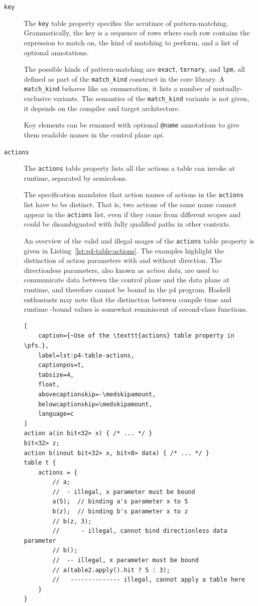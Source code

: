 \begin{description}

\item[\texttt{key}] The \texttt{key} table property specifies the scrutinee of
pattern-matching. Grammatically, the key is a sequence of rows where each row
contains the expression to match on, the kind of matching to perform, and a list
of optional annotations.

The possible kinds of pattern-matching are \texttt{exact}, \texttt{ternary}, and
\texttt{lpm}, all defined as part of the \texttt{match\_kind} construct in the
core library. A \texttt{match\_kind} behaves like an enumeration, it lists a
number of mutually-exclusive variants. The semantics of the \texttt{match\_kind}
variants is not given, it depends on the compiler and target architecture.

Key elements can be renamed with optional \texttt{@name} annotations to give
them readable names in the control plane \acrshort{api}.

\item[\texttt{actions}] The \texttt{actions} table property lists all the
actions a table can invoke at runtime, separated by semicolons.

The specification mandates that action names of actions in the \texttt{actions}
list have to be distinct. That is, two actions of the same name cannot appear in
the \texttt{actions} list, even if they come from different scopes and could be
disambiguated with fully qualified paths in other contexts.

An overview of the valid and illegal usages of the \texttt{actions} table
property is given in Listing~\ref{lst:p4-table-actions}. The examples highlight
the distinction of action parameters with and without direction. The
directionless parameters, also known as \emph{action data}, are used to
communicate data between the control plane and the data plane at runtime, and
therefore cannot be bound in the \acrshort{p4} program. Haskell enthusiasts may
note that the distinction between compile time and runtime -bound values is
somewhat reminiscent of second-class functions.

\begin{lstlisting}[
	caption={~Use of the \texttt{actions} table property in \pfs.},
	label=lst:p4-table-actions,
	captionpos=t,
	tabsize=4,
	float,
	abovecaptionskip=-\medskipamount,
	belowcaptionskip=\medskipamount,
	language=c
]
action a(in bit<32> x) { /* ... */ }
bit<32> z;
action b(inout bit<32> x, bit<8> data) { /* ... */ }
table t {
	actions = {
		// a;
		//  - illegal, x parameter must be bound
		a(5);  // binding a's parameter x to 5
		b(z);  // binding b's parameter x to z
		// b(z, 3);
		//      - illegal, cannot bind directionless data parameter
		// b();
		//  -- illegal, x parameter must be bound
		// a(table2.apply().hit ? 5 : 3);
		//   -------------- illegal, cannot apply a table here
	}
}
\end{lstlisting}


\end{description}
